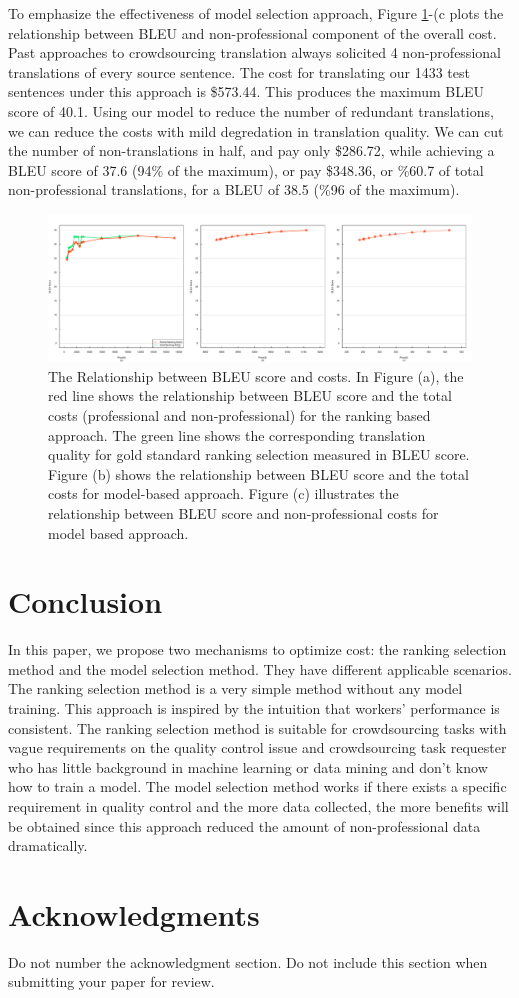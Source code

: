 \documentclass[11pt]{article}
\begin{document}
To emphasize the effectiveness of model selection approach, Figure \ref{fbleucost}-(c plots the relationship between BLEU and non-professional component of the overall cost.  Past approaches to crowdsourcing translation always solicited 4 non-professional translations of every source sentence. The cost for translating our 1433 test sentences under this approach is \$573.44.  This produces the maximum BLEU score of 40.1.  Using our model to reduce the number of redundant translations, we can reduce the costs with mild degredation in translation quality.  We can cut the number of non-translations in half, and pay only \$286.72, while achieving a BLEU score of 37.6 (94\% of the maximum), or pay \$348.36, or \%60.7 of total non-professional translations, for a BLEU of 38.5 (\%96 of  the maximum).

\begin{figure}[htbp]
  \centering
  \includegraphics[width=\linewidth]{cost-bleu/pricecost.pdf}
  \caption{The Relationship between BLEU score and costs. In Figure (a), the red line shows the relationship between BLEU score and  the total costs (professional and non-professional) for the ranking based approach. The green line shows the corresponding translation quality for gold standard ranking selection measured in BLEU score. Figure (b) shows the relationship between BLEU score and the total costs for model-based approach. Figure (c)  illustrates the relationship between BLEU score and non-professional costs for model based approach.}
    \label{fbleucost}
\end{figure}


\section{Conclusion}
In this paper, we propose two mechanisms to optimize cost: the ranking selection method and the model selection method. They have  different applicable scenarios. The ranking selection method is a very simple method without any model training. This approach is inspired by the intuition that workers' performance is consistent. The ranking selection method is suitable for crowdsourcing tasks with vague requirements on the quality control issue and crowdsourcing task requester who has little background in machine learning or data mining and don't know how to train a model.
The model selection method works if there exists a specific requirement in quality control and the more data collected, the more benefits will be obtained since this approach reduced the amount of non-professional data  dramatically.
\section*{Acknowledgments}

Do not number the acknowledgment section. Do not include this section when submitting your paper for review.



\end{document}
